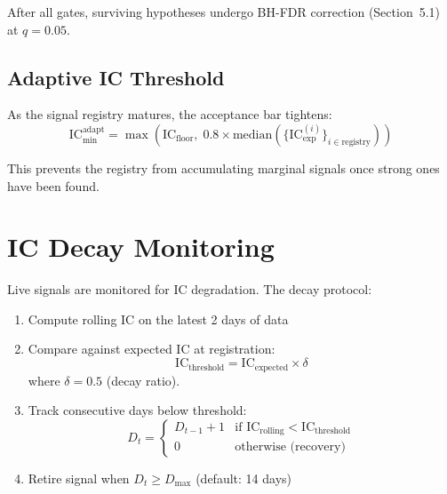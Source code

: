 \documentclass[11pt,a4paper]{article}
\begin{document}
After all gates, surviving hypotheses undergo BH-FDR correction
(Section~5.1) at $q = 0.05$.

\subsection{Adaptive IC Threshold}

As the signal registry matures, the acceptance bar tightens:
\begin{equation}
    \mathrm{IC}_{\min}^{\mathrm{adapt}} = \max\!\left(
        \mathrm{IC}_{\mathrm{floor}},\;
        0.8 \times \mathrm{median}\!\left(
            \{\mathrm{IC}_{\mathrm{exp}}^{(i)}\}_{i \in \mathrm{registry}}
        \right)
    \right)
    \label{eq:adaptive_ic}
\end{equation}

This prevents the registry from accumulating marginal signals once
strong ones have been found.

\section{IC Decay Monitoring}

Live signals are monitored for IC degradation. The decay protocol:

\begin{enumerate}    \item Compute rolling IC on the latest 2 days of data
    \item Compare against expected IC at registration:
        \begin{equation}
            \mathrm{IC}_{\mathrm{threshold}} =
                \mathrm{IC}_{\mathrm{expected}} \times \delta
            \label{eq:decay_threshold}
        \end{equation}
        where $\delta = 0.5$ (decay ratio).
    \item Track consecutive days below threshold:
        \begin{equation}
            D_t = \begin{cases}
                D_{t-1} + 1 & \text{if } \mathrm{IC}_{\mathrm{rolling}} <
                    \mathrm{IC}_{\mathrm{threshold}} \\
                0 & \text{otherwise (recovery)}
            \end{cases}
            \label{eq:decay_counter}
        \end{equation}
    \item Retire signal when $D_t \geq D_{\max}$ (default: 14 days)
\end{enumerate}
\end{document}

